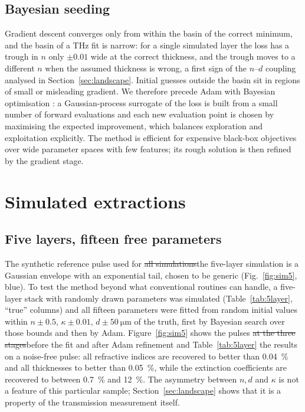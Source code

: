 \documentclass{optica-article}
\DeclareRobustCommand{\chg}[1]{{\color{blue}#1}}
\DeclareRobustCommand{\del}[1]{{\color{red}\sout{#1}}}
\newcommand{\kap}{\kappa}
\begin{document}
\subsection{Bayesian seeding}
Gradient descent converges only from within the basin of the correct minimum, and the basin of a THz fit is narrow: for a single simulated layer the loss has a trough in $n$ only $\pm0.01$ wide at the correct thickness, and the trough moves to a different $n$ when the assumed thickness is wrong, a first sign of the $n$--$d$ coupling analysed in Section~\ref{sec:landscape}. Initial guesses outside the basin sit in regions of small or misleading gradient. We therefore precede Adam with Bayesian optimisation \cite{Mockus1978,Rasmussen2006,Srinivas2010,Snoek2012,Shahriari2016,Frazier2018}: a Gaussian-process surrogate of the loss is built from a small number of forward evaluations and each new evaluation point is chosen by maximising the expected improvement, which balances exploration and exploitation explicitly. The method is efficient for expensive black-box objectives over wide parameter spaces with few features; its rough solution is then refined by the gradient stage.

\section{Simulated extractions}\label{sec:sim}
\subsection{Five layers, fifteen free parameters}
The synthetic reference pulse used for \del{all simulations}\chg{the five-layer simulation} is a Gaussian envelope with an exponential tail, chosen to be generic (Fig.~\ref{fig:sim5}, blue). To test the method beyond what conventional routines can handle, a five-layer stack with randomly drawn parameters was simulated (Table~\ref{tab:5layer}, ``true'' columns) and all fifteen parameters were fitted from random initial values within $n\pm0.5$, $\kap\pm0.01$, $d\pm\SI{50}{\micro\metre}$ of the truth, first by Bayesian search over those bounds and then by Adam. Figure~\ref{fig:sim5} shows the pulses \del{at the three stages}\chg{before the fit and after Adam refinement} and Table~\ref{tab:5layer} the results on a noise-free pulse: all refractive indices are recovered to better than \SI{0.04}{\percent} and all thicknesses to better than \SI{0.05}{\percent}, while the extinction coefficients are recovered to between \SI{0.7}{\percent} and \SI{12}{\percent}. The asymmetry between $n,d$ and $\kap$ is not a feature of this particular sample; Section~\ref{sec:landscape} shows that it is a property of the transmission measurement itself.
\end{document}

